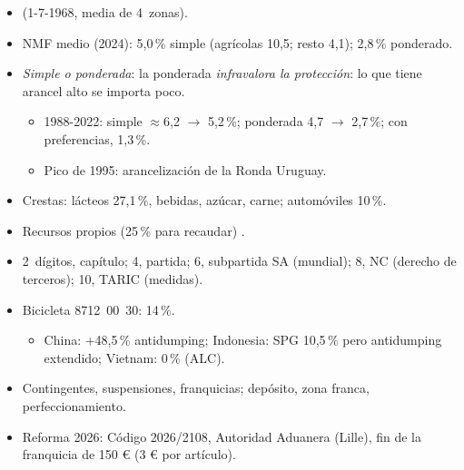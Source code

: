 \documentclass{article}
\begin{document}
\begin{columnas}
\begin{itemize}
\item {} (1-7-1968, media de 4~zonas).
\item NMF medio (2024): 5,0\,\% simple (agrícolas 10,5; resto 4,1); 2,8\,\% ponderado.
\item \emph{Simple o ponderada}: la ponderada \emph{infravalora la protección}: lo que tiene arancel alto se importa poco.
  \begin{itemize}
  \item 1988-2022: simple $\approx$6,2 $\to$ 5,2\,\%; ponderada 4,7 $\to$ 2,7\,\%; con preferencias, 1,3\,\%.
  \item Pico de 1995: arancelización de la Ronda Uruguay.
  \end{itemize}
\item Crestas: lácteos 27,1\,\%, bebidas, azúcar, carne; automóviles 10\,\%.
\item Recursos propios (25\,\% para recaudar) .
\end{itemize}
\begin{itemize}
\item 2~dígitos, capítulo; 4, partida; 6, subpartida SA (mundial); 8, NC (derecho de terceros); 10, TARIC (medidas).
\item Bicicleta 8712~00~30: 14\,\%.
  \begin{itemize}
  \item China: +48,5\,\% antidumping; Indonesia: SPG 10,5\,\% pero antidumping extendido; Vietnam: 0\,\% (ALC).
  \end{itemize}
\end{itemize}
\begin{itemize}
\item Contingentes, suspensiones, franquicias; depósito, zona franca, perfeccionamiento.
\item Reforma 2026: Código 2026/2108, Autoridad Aduanera (Lille), fin de la franquicia de 150 € (3 € por artículo).
\end{itemize}


\end{columnas}
\end{document}
